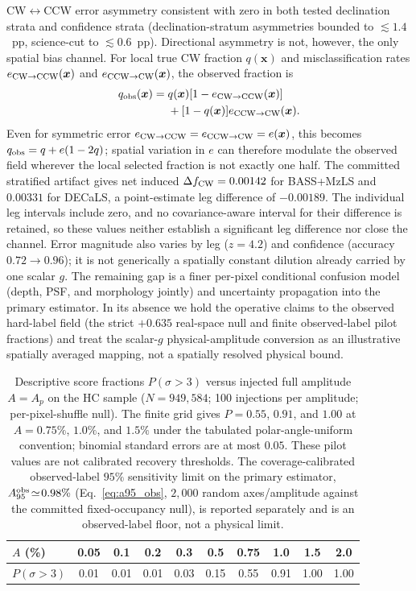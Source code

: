 \documentclass[twocolumn,linenumbers]{aastex702}
\begin{document}
CW$\leftrightarrow$CCW error asymmetry consistent with zero in both tested
declination strata and confidence strata (declination-stratum asymmetries bounded to $\lesssim\!1.4$~pp,
science-cut to $\lesssim\!0.6$~pp). Directional asymmetry is not, however,
the only spatial bias channel. For local true CW fraction $q(\bm{x})$ and
misclassification rates $e_{\rm CW\to CCW}(\bm{x})$ and
$e_{\rm CCW\to CW}(\bm{x})$, the observed fraction is
\begin{equation}
\begin{aligned}
q_{\rm obs}(\bm{x})={}&q(\bm{x})[1-e_{\rm CW\to CCW}(\bm{x})]\\
 &+[1-q(\bm{x})]e_{\rm CCW\to CW}(\bm{x}).
\end{aligned}
\label{eq:spatial_confusion_transfer}
\end{equation}
Even for symmetric error $e_{\rm CW\to CCW}=e_{\rm CCW\to CW}=e(\bm{x})$,
this becomes $q_{\rm obs}=q+e(1-2q)$; spatial variation in $e$ can therefore
modulate the observed field wherever the local selected fraction is not
exactly one half. The committed stratified artifact gives net induced
$\Delta f_{\rm CW}=0.00142$ for BASS+MzLS and $0.00331$ for DECaLS, a
point-estimate leg difference of $-0.00189$. The individual leg intervals
include zero, and no covariance-aware interval for their difference is
retained, so these values neither establish a significant leg difference
nor close the channel. Error magnitude also varies by leg ($z\!=\!4.2$)
and confidence (accuracy $0.72\!\to\!0.96$); it is not generically a
spatially constant dilution already carried by one scalar $g$. The remaining
gap is a finer per-pixel conditional confusion model (depth, PSF, and
morphology jointly) and uncertainty propagation into the primary estimator.
In its absence we hold the operative claims to the observed hard-label field
(the strict $+0.635$ real-space null and finite observed-label pilot
fractions) and treat the scalar-$g$ physical-amplitude conversion as an
illustrative spatially averaged mapping, not a spatially resolved physical
bound.

\begin{table}[t]
\caption{Descriptive score fractions $P(\sigma>3)$ versus injected full amplitude $A=A_p$ on the HC sample ($N=949{,}584$; 100 injections per amplitude; per-pixel-shuffle null). The finite grid gives $P=0.55$, $0.91$, and $1.00$ at $A=0.75\%$, $1.0\%$, and $1.5\%$ under the tabulated polar-angle-uniform convention; binomial standard errors are at most $0.05$. These pilot values are not calibrated recovery thresholds. The coverage-calibrated observed-label $95\%$ sensitivity limit on the primary estimator, $A_{95}^{\rm obs}\!\simeq\!0.98\%$ (Eq.~\ref{eq:a95_obs}, $2{,}000$ random axes/amplitude against the committed fixed-occupancy null), is reported separately and is an observed-label floor, not a physical limit.\label{tab:injection_recovery}}
\begin{tabular}{lccccccccc}
$A$ (\%) & 0.05 & 0.1 & 0.2 & 0.3 & 0.5 & 0.75 & 1.0 & 1.5 & 2.0 \\
\hline
$P(\sigma\!>\!3)$ & 0.01 & 0.01 & 0.01 & 0.03 & 0.15 & 0.55 & 0.91 & 1.00 & 1.00 \\
\end{tabular}
\end{table}
\end{document}
